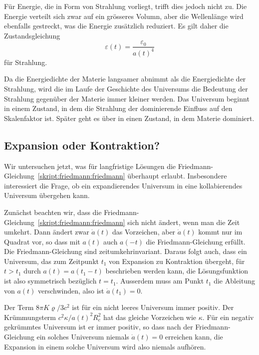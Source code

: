 Für Energie, die in Form von Strahlung vorliegt, trifft dies jedoch nicht
zu.
Die Energie verteilt sich zwar auf ein grösseres Volumn, 
aber die Wellenlänge wird ebenfalls gestreckt, was
die Energie zusätzlich reduziert.
Es gilt daher die Zustandsgleichung
%
\begin{equation}
\varepsilon(t) = \frac{\varepsilon_0}{a(t)^4}
\label{skript:friedmann:zustandstrahlung}
\end{equation}
für Strahlung.

Da die Energiedichte der Materie langsamer abnimmt als die Energiedichte
der Strahlung, wird die im Laufe der Geschichte des Universums die
Bedeutung der Strahlung gegenüber der Materie immer kleiner werden.
Das Universum beginnt in einem Zustand, in dem die Strahlung der
dominierende Einfluss auf den Skalenfaktor ist. 
Später geht es über in einen Zustand, in dem Materie dominiert.

\subsection{Expansion oder Kontraktion?}
%
%
Wir untersuchen jetzt, was für langfristige Lösungen die
Friedmann-Gleichung~\eqref{skript:friedmann:friedmann}
überhaupt erlaubt.
Insbesondere interessiert die Frage, ob ein expandierendes Universum
in eine kollabierendes Universum übergehen kann.

Zunächst beachten wir, dass die 
Friedmann-Gleichung~\eqref{skript:friedmann:friedmann}
sich nicht ändert, wenn man die Zeit umkehrt.
Dann ändert zwar $\dot a(t)$ das Vorzeichen, aber $\dot a(t)$ kommt
nur im Quadrat vor, so dass mit $a(t)$ auch $a(-t)$ die Friedmann-Gleichung
erfüllt.
Die Friedmann-Gleichung sind zeitumkehrinvariant.
Daraus folgt auch, dass ein Universum, das zum Zeitpunkt $t_1$
von Expansion zu Kontraktion übergeht, für $t>t_1$ durch
$a(t)=a(t_1-t)$ beschrieben werden kann, die Lösungsfunktion ist
also symmetrisch bezüglich $t=t_1$.
Ausserdem muss
am Punkt $t_1$ die Ableitung von $a(t)$ verschwinden, also ist
$\dot a(t_1)=0$.

Der Term $8\pi K\varrho/3c^2$ ist für ein nicht leeres Universum
immer positiv.
Der Krümmungsterm $c^2\kappa/a(t)^2R_c^2$ hat das gleiche Vorzeichen
wie $\kappa$.
Für ein negativ gekrümmtes Universum ist er immer positiv, so dass
nach der Friedmann-Gleichung ein solches Universum niemals $\dot a(t)=0$
erreichen kann, die Expansion in einem solche Universum wird also
niemals aufhören.

